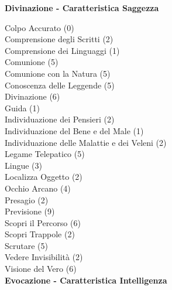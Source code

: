 \begin{multicols}{3}
{	\medskip\textbf{Divinazione - Caratteristica Saggezza}

	Colpo Accurato (0)\\
	Comprensione degli Scritti (2)\\
	Comprensione dei Linguaggi (1)\\
	Comunione (5)\\
	Comunione con la Natura (5)\\
	Conoscenza delle Leggende (5)\\
	Divinazione (6)\\
	Guida (1)\\
	Individuazione dei Pensieri (2)\\
	Individuazione del Bene e del Male (1)\\
	Individuazione delle Malattie e dei Veleni (2)\\
	Legame Telepatico (5)\\
	Lingue (3)\\
	Localizza Oggetto (2)\\
	Occhio Arcano (4)\\
	Presagio (2)\\
	Previsione (9)\\
	Scopri il Percorso (6)\\
	Scopri Trappole (2)\\
	Scrutare (5)\\
	Vedere Invisibilità (2)\\
	Visione del Vero (6)\\

	\medskip\textbf{Evocazione - Caratteristica Intelligenza}

}
\end{multicols}
